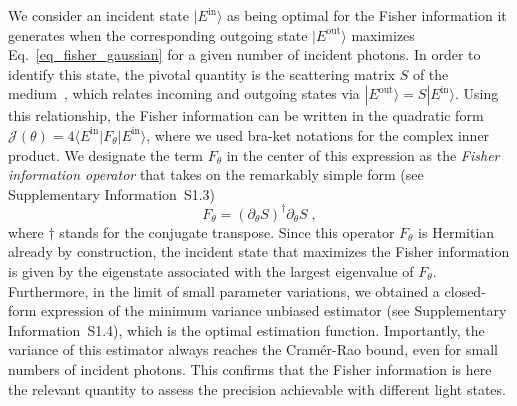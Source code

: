 \documentclass[aps,pra,twocolumn,amsmath,amssymb,superscriptaddress,10pt,nobibnotes]{revtex4-2}
\begin{document}
We consider an incident state $|E^\mathrm{in}\rangle$ as being optimal for the Fisher information it generates when the corresponding outgoing state $|E^\mathrm{out}\rangle$ maximizes Eq.~\eqref{eq_fisher_gaussian} for a given number of incident photons. In order to identify this state, the pivotal quantity is the scattering matrix $S$ of the medium~\cite{rotter_light_2017}, which relates incoming and outgoing states via $ |E^\mathrm{out}\rangle =S |E^\mathrm{in}\rangle $. Using this relationship, the Fisher information can be written in the quadratic form $\mathcal{J}(\theta)=4 \langle  E^\mathrm{in} | F_\theta | E^\mathrm{in} \rangle $, where we used bra-ket notations for the complex inner product. We designate the term $F_\theta$ in the center of this expression as the {\it Fisher information operator} that takes on the remarkably simple form (see Supplementary Information~S1.3)
\begin{equation}
F_\theta= (\partial_\theta S) ^\dagger \partial_\theta S \; ,
\end{equation}
where $\dagger$ stands for the conjugate transpose. Since this operator $F_\theta$ is Hermitian already by construction, the incident state that maximizes the Fisher information is given by the eigenstate associated with the largest eigenvalue of $F_\theta$. Furthermore, in the limit of small parameter variations, we obtained a closed-form expression of the minimum variance unbiased estimator (see Supplementary Information~S1.4), which is the optimal estimation function. Importantly, the variance of this estimator always reaches the Cramér-Rao bound, even for small numbers of incident photons. This confirms that the Fisher information is here the relevant quantity to assess the precision achievable with different light states. 
\end{document}

